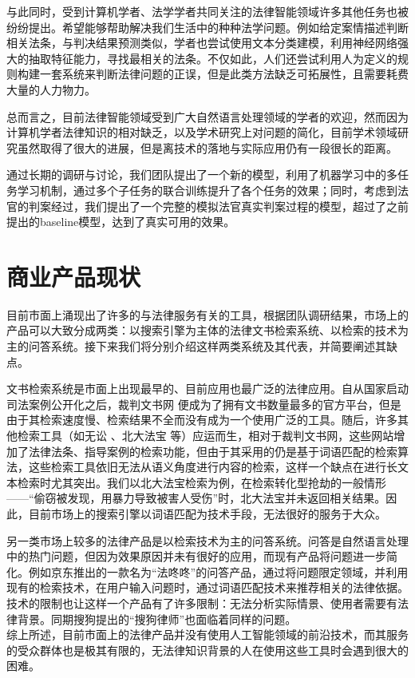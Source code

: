 与此同时，受到计算机学者、法学学者共同关注的法律智能领域许多其他任务也被纷纷提出。希望能够帮助解决我们生活中的种种法学问题。例如给定案情描述判断相关法条，与判决结果预测类似，学者也尝试使用文本分类建模，利用神经网络强大的抽取特征能力，寻找最相关的法条。不仅如此，人们还尝试利用人为定义的规则构建一套系统来判断法律问题的正误，但是此类方法缺乏可拓展性，且需要耗费大量的人力物力。


总而言之，目前法律智能领域受到广大自然语言处理领域的学者的欢迎，然而因为计算机学者法律知识的相对缺乏，以及学术研究上对问题的简化，目前学术领域研究虽然取得了很大的进展，但是离技术的落地与实际应用仍有一段很长的距离。

通过长期的调研与讨论，我们团队提出了一个新的模型，利用了机器学习中的多任务学习机制，通过多个子任务的联合训练提升了各个任务的效果；同时，考虑到法官的判案经过，我们提出了一个完整的模拟法官真实判案过程的模型，超过了之前提出的baseline模型，达到了真实可用的效果。


\section{商业产品现状}
目前市面上涌现出了许多的与法律服务有关的工具，根据团队调研结果，市场上的产品可以大致分成两类：以搜索引擎为主体的法律文书检索系统、以检索的技术为主的问答系统。接下来我们将分别介绍这样两类系统及其代表，并简要阐述其缺点。

文书检索系统是市面上出现最早的、目前应用也最广泛的法律应用。自从国家启动司法案例公开化之后，裁判文书网 便成为了拥有文书数量最多的官方平台，但是由于其检索速度慢、检索结果不全而没有成为一个使用广泛的工具。随后，许多其他检索工具（如无讼 、北大法宝 等）应运而生，相对于裁判文书网，这些网站增加了法律法条、指导案例的检索功能，但由于其采用的仍是基于词语匹配的检索算法，这些检索工具依旧无法从语义角度进行内容的检索，这样一个缺点在进行长文本检索时尤其突出。我们以北大法宝检索为例，在检索转化型抢劫的一般情形——“偷窃被发现，用暴力导致被害人受伤”时，北大法宝并未返回相关结果。因此，目前市场上的搜索引擎以词语匹配为技术手段，无法很好的服务于大众。

另一类市场上较多的法律产品是以检索技术为主的问答系统。问答是自然语言处理中的热门问题，但因为效果原因并未有很好的应用，而现有产品将问题进一步简化。例如京东推出的一款名为“法咚咚”的问答产品，通过将问题限定领域，并利用现有的检索技术，在用户输入问题时，通过词语匹配技术来推荐相关的法律依据。技术的限制也让这样一个产品有了许多限制：无法分析实际情景、使用者需要有法律背景。同期搜狗提出的“搜狗律师”也面临着同样的问题。\\

综上所述，目前市面上的法律产品并没有使用人工智能领域的前沿技术，而其服务的受众群体也是极其有限的，无法律知识背景的人在使用这些工具时会遇到很大的困难。

